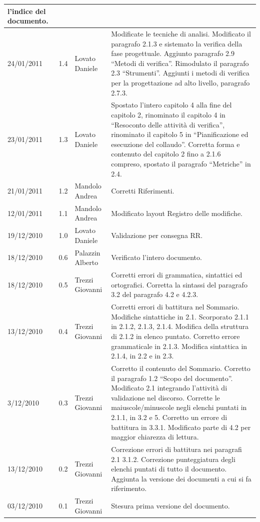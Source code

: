 \begin{longtable}{|p{}|c|p{}|p{}|}
l'indice del documento.\\
\hline
24/01/2011 & 1.4 & Lovato Daniele & Modificate le tecniche di analisi.
Modificato il paragrafo 2.1.3 e sistemato la verifica della fase progettuale.
Aggiunto paragrafo 2.9 ``Metodi di verifica''. Rimodulato il paragrafo 2.3
``Strumenti''. Aggiunti i metodi di verifica per la progettazione ad alto
livello, paragrafo 2.7.3.\\
\hline
23/01/2011 & 1.3 & Lovato Daniele & Spostato l'intero capitolo 4 alla fine
del capitolo 2, rinominato il capitolo 4 in ``Resoconto delle attivit\`a di
verifica'', rinominato il capitolo 5 in ``Pianificazione ed esecuzione del
collaudo''. Corretta forma e contenuto del capitolo 2 fino a 2.1.6 compreso,
spostato il paragrafo ``Metriche'' in 2.4.  
\\
\hline
21/01/2011 & 1.2 & Mandolo Andrea & Corretti Riferimenti.\\
\hline
12/01/2011 & 1.1 & Mandolo Andrea & Modificato layout Registro delle
modifiche.\\
\hline
19/12/2010 & 1.0 & Lovato Daniele & Validazione per consegna RR.\\
\hline
18/12/2010 & 0.6 & Palazzin Alberto & Verificato l'intero documento.\\
\hline
18/12/2010 & 0.5 & Trezzi Giovanni & Corretti errori di grammatica, sintattici
ed ortografici. Corretta la sintassi del paragrafo 3.2 del paragrafo 4.2 e
4.2.3.\\
\hline
13/12/2010 & 0.4 & Trezzi Giovanni & Corretti errori di battitura nel Sommario.
Modifiche sintattiche in 2.1. Scorporato 2.1.1 in 2.1.2, 2.1.3, 2.1.4. Modifica della
struttura di 2.1.2 in elenco puntato. Corretto errore grammaticale in 2.1.3.
Modifica sintattica in 2.1.4, in 2.2 e in 2.3.\\
\hline
3/12/2010 & 0.3 & Trezzi Giovanni & Corretto il contenuto del Sommario. Corretto
il paragrafo 1.2 ``Scopo del documento''. Modificato 2.1 integrando l'attivit\`a
di validazione nel discorso. Corrette le maiuscole/minuscole negli elenchi
puntati in 2.1.1, in 3.2 e 5. Corretto un errore di battitura in 3.3.1.
Modificato parte di 4.2 per maggior chiarezza di lettura.\\
\hline
13/12/2010 & 0.2 & Trezzi Giovanni & Correzione errori di battitura nei
paragrafi 2.1 3.1.2. Correzione punteggiatura degli elenchi puntati di tutto il documento.
Aggiunta la versione dei documenti a cui si fa riferimento.\\
\hline
03/12/2010 & 0.1 & Trezzi Giovanni & Stesura prima versione del documento.\\
\end{longtable}


